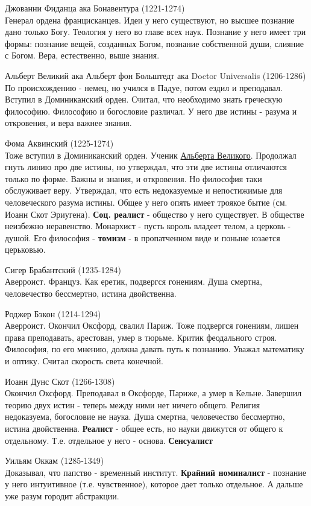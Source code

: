 \documentclass[12pt,a4paper]{article}
\begin{document}
Джованни Фиданца ака Бонавентура (1221-1274)\\ 
Генерал ордена францисканцев. Идеи у него существуют, но высшее познание дано только Богу. Теология у него во главе всех наук. Познание у него имеет три формы: познание вещей, созданных Богом, познание собственной души, слияние с Богом. Вера, естественно, выше знания.

Альберт Великий  ака Альберт фон Больштедт ака Doctor Universalis (1206-1286)\\
По происхождению - немец, но учился в Падуе, потом ездил и преподавал. Вступил в Доминиканский орден. Считал, что необходимо знать греческую философию. Философию и богословие различал. У него две истины - разума и откровения, и вера важнее знания.

Фома Аквинский (1225-1274)\\
 Тоже вступил в Доминиканский орден. Ученик \underline{Альберта Великого}. Продолжал гнуть линию про две истины, но утверждал, что эти две истины отличаются только по форме. Важны и знания, и откровения. Но философия таки обслуживает веру. Утверждал, что есть недоказуемые и непостижимые для человеческого разума истины. Общее у него опять имеет троякое бытие (см. Иоанн Скот Эриугена). \textbf{Соц. реалист} - общество у него существует. В обществе неизбежно неравенство. Монархист - пусть король владеет телом, а церковь - душой. Его философия - \textbf{томизм} - в пропатченном виде и поныне юзается церьковью.

Сигер Брабантский (1235-1284)\\
Аверроист. Француз. Как еретик, подвергся гонениям. Душа смертна, человечество бессмертно, истина двойственна.
 
Роджер Бэкон (1214-1294)\\ 
Аверроист. Окончил Оксфорд, свалил  Париж. Тоже подвергся гонениям, лишен права преподавать, арестован, умер в тюрьме. Критик феодального строя. Философия, по его мнению, должна давать путь к познанию. Уважал математику и оптику. Считал скорость света конечной.

Иоанн Дунс Скот (1266-1308)\\
Окончил Оксфорд. Преподавал в Оксфорде, Париже, а умер в Кельне. Завершил теорию двух истин - теперь между ними нет ничего общего. Религия недоказуема, богословие не наука. Душа смертна, человечество бессмертно, истина двойственна. \textbf{Реалист} - общее есть, но науки движутся от общего к отдельному. Т.е. отдельное у  него - основа. \textbf{Сенсуалист}
 
Уильям Оккам (1285-1349)\\
Доказывал, что папство - временный институт. \textbf{Крайний номиналист} - познание у него интуитивное (т.е. чувственное), которое дает только отдельное. А дальше уже разум городит абстракции.
\end{document}
